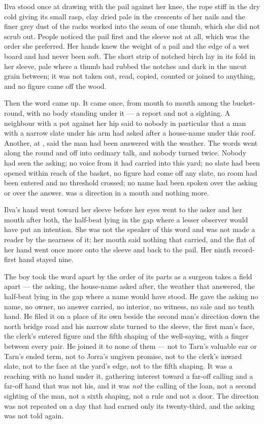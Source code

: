 Ilva stood once at  drawing with the pail against her knee, the rope stiff in the dry cold giving its small rasp, clay dried pale in the crescents of her nails and the finer grey dust of the racks worked into the seam of one thumb, which she did not scrub out. People noticed the pail first and the sleeve not at all, which was the order she preferred. Her hands knew the weight of a pail and the edge of a wet board and had never been soft. The short strip of notched birch lay in its fold in her sleeve, pale where a thumb had rubbed the notches and dark in the uncut grain between; it was not taken out, read, copied, counted or joined to anything, and no figure came off the wood.

Then the word came up. It came once, from mouth to mouth among the bucket-round, with no body standing under it --- a report and not a sighting. A neighbour with a pot against her hip said to nobody in particular that a man with a narrow slate under his arm had asked after a house-name under this roof. Another, at , said the man had been answered with the weather. The words went along the round and off into ordinary talk, and nobody turned twice. Nobody had seen the asking; no voice from it had carried into this yard; no slate had been opened within reach of the basket, no figure had come off any slate, no room had been entered and no threshold crossed; no name had been spoken over the asking or over the answer.  was a direction in a mouth and nothing more.

Ilva's hand went toward her sleeve before her eyes went to the asker and her mouth after both, the half-beat lying in the gap where a lesser observer would have put an intention. She was not the speaker of this word and was not made a reader by the nearness of it; her mouth said nothing that carried, and the flat of her hand went once more onto the sleeve and back to the pail. Her ninth record-first hand stayed nine.

The boy took the word apart by the order of its parts as a surgeon takes a field apart --- the asking, the house-name asked after, the weather that answered, the half-beat lying in the gap where a name would have stood. He gave the asking no name, no owner, no answer carried, no interior, no witness, no sale and no tenth hand. He filed it on a place of its own beside the second man's direction down the north bridge road and his narrow slate turned to the sleeve, the first man's face, the clerk's entered figure and the fifth shaping of the well-saying, with a finger between every pair. He joined it to none of them --- not to Tarn's valuable ear or Tarn's ended term, not to Jorra's ungiven promise, not to the clerk's inward slate, not to the face at the yard's edge, not to the fifth shaping. It was a reaching with no hand under it, gathering interest toward a far-off calling and a far-off hand that was not his, and it was \emph{not} the calling of the loan, not a second sighting of the man, not a sixth shaping, not a rule and not a door. The direction was not repeated on a day that had earned only its twenty-third, and the asking was not told again.

